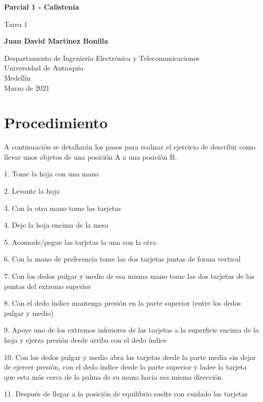 \documentclass{article}
\begin{document}
\begin{titlepage}
    \begin{center}
        \vspace*{1cm}
            
        \Huge
        \textbf{Parcial 1 - Calistenia}
            
        \vspace{0.5cm}
        \LARGE
        Tarea 1
            
        \vspace{5cm}
            
        \textbf{Juan David Martinez Bonilla}
            
        \vfill
            
        \vspace{0.8cm}
            
        \Large
        Despartamento de Ingeniería Electrónica y Telecomunicaciones\\
        Universidad de Antioquia\\
        Medellín\\
        Marzo de 2021
            
    \end{center}
\end{titlepage}


\newpage
\section{Procedimiento}
A continuación se detallarán los pasos para realizar el ejercicio
de describir como llevar unos objetos de una posición A a una posición B.


1.	Tome la hoja con una mano


2.	Levante la hoja 


3.	Con la otra mano tome las tarjetas


4.	Deje la hoja encima de la mesa 


5.	Acomode/pegue las tarjetas la una con la otra


6.	Con la mano de preferencia tome las dos tarjetas juntas de forma vertical


7.	Con los dedos pulgar y medio de esa misma mano tome las dos tarjetas de las puntas del extremo superior


8.	Con el dedo índice mantenga presión en la parte superior (entre los dedos pulgar y medio)


9.	Apoye uno de los extremos inferiores de las tarjetas a la superficie encima de la hoja y ejerza presión desde arriba con el dedo índice 


10.	Con los dedos pulgar y medio abra las tarjetas desde la parte media sin dejar de ejercer presión, con el dedo índice desde la parte superior y ladee la tarjeta que esta más cerca de la palma de su mano hacia esa misma dirección 


11.	Después de llegar a la posición de equilibrio suelte con cuidado las tarjetas
\end{document}
